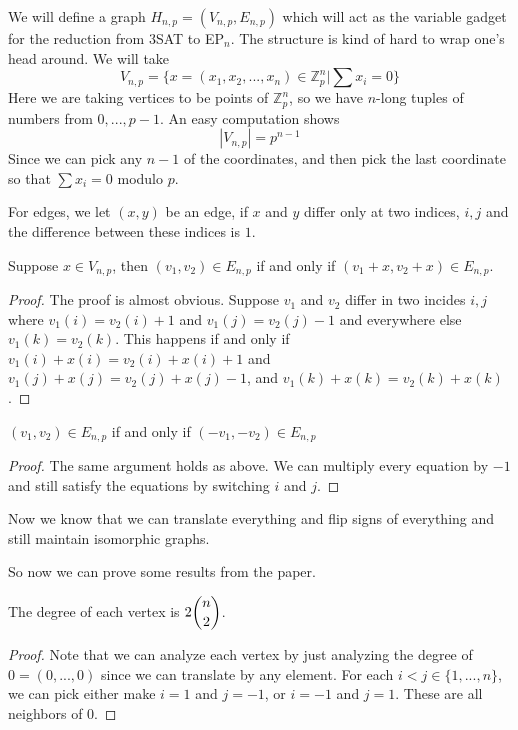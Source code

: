 \documentclass[runningheads,a4paper]{llncs}
\begin{document}
We will define a graph $H_{n,p} = (V_{n,p}, E_{n,p})$ which will act as the variable gadget for the reduction from 3SAT to EP$_{n}$. The structure is kind of hard to wrap one's head around. We will take 
\[ V_{n,p} = \{ x = (x_1, x_2, ..., x_n) \in \mathbb{Z}_p^n | \sum x_i = 0 \} \]
Here we are taking vertices to be points of $\mathbb{Z}_p^n$, so we have $n$-long tuples of numbers from $0, ..., p-1$. An easy computation shows
\[ |V_{n,p}| = p^{n-1} \]
Since we can pick any $n-1$ of the coordinates, and then pick the last coordinate so that $\sum x_i = 0$ modulo $p$.

For edges, we let $(x,y)$ be an edge, if $x$ and $y$ differ only at two indices, $i,j$ and the difference between these indices is $1$. 

\begin{lemma}
Suppose $x \in V_{n,p}$, then $(v_1, v_2) \in E_{n,p}$ if and only if $(v_1+x, v_2+x) \in E_{n,p}$.
\end{lemma}

\begin{proof}
The proof is almost obvious. Suppose $v_1$ and $v_2$ differ in two incides $i,j$ where $v_1(i) = v_2(i) + 1$ and $v_1(j) = v_2(j) - 1$ and everywhere else $v_1(k) = v_2(k)$. This happens if and only if $v_1(i) + x(i) = v_2(i) + x(i) + 1$ and $v_1(j) + x(j) = v_2(j) + x(j) - 1$, and $v_1(k) + x(k) = v_2(k) + x(k)$. 
\end{proof}

\begin{lemma}
$(v_1, v_2) \in E_{n,p}$ if and only if $(-v_1, -v_2) \in E_{n,p}$
\end{lemma}

\begin{proof}
The same argument holds as above. We can multiply every equation by $-1$ and still satisfy the equations by switching $i$ and $j$.
\end{proof}

Now we know that we can translate everything and flip signs of everything and still maintain isomorphic graphs. 

So now we can prove some results from the paper.

\begin{lemma}
The degree of each vertex is $2\dbinom{n}{2}$.
\end{lemma}

\begin{proof}
Note that we can analyze each vertex by just analyzing the degree of $0 = (0, ..., 0)$ since we can translate by any element. For each $i < j \in \{ 1, ..., n\}$, we can pick either make $i = 1$ and $j = -1$, or $i = -1$ and $j = 1$. These are all neighbors of $0$. 
\end{proof}
\end{document}
